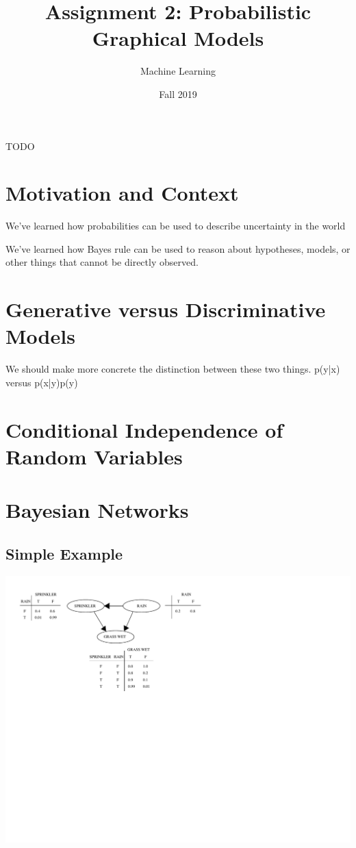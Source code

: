 \documentclass[assignment02_Solutions]{subfiles}
\title{Assignment 2: Probabilistic Graphical Models}
\author{Machine Learning}
\date{Fall 2019}
\begin{document}
\maketitle
\thispagestyle{firstpage}


\begin{learningobjectives}
\bi
\item TODO
\ei
\end{learningobjectives}

\section{Motivation and Context}
\bi
\item We’ve learned how probabilities can be used to describe uncertainty in the world
\item We’ve learned how Bayes rule can be used to reason about hypotheses, models, or other things that cannot be directly observed.
\ei

\section{Generative versus Discriminative Models}
We should make more concrete the distinction between these two things.
p(y|x) versus p(x|y)p(y)

\section{Conditional Independence of Random Variables}

\section{Bayesian Networks}

\subsection{Simple Example}

\begin{center}
\includegraphics[width=0.7\linewidth]{figures/SimpleBayesNet}
\end{center}
\end{document}

